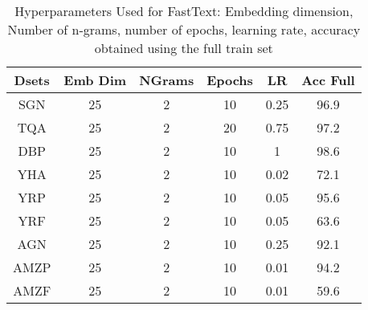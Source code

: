 \documentclass[11pt,a4paper]{article}
\begin{document}
\begin{table}[t]
\begin{center}
\small\addtolength{\tabcolsep}{-3pt}
\begin{tabular}{|c|c|c|c|c|c|}
\hline
Dsets & Emb Dim & NGrams & Epochs & LR & Acc Full  \\ \hline
SGN &  25 & 2 & 10 & 0.25 & 96.9   \\ \hline
TQA &  25 & 2 & 20 & 0.75 & 97.2 \\ \hline
DBP  &  25 & 2 & 10 & 1 & 98.6 \\ \hline
YHA  &  25 & 2 & 10 & 0.02 & 72.1   \\ \hline
YRP  &  25 & 2 & 10 & 0.05 & 95.6 \\ \hline
YRF & 25 & 2 & 10 & 0.05 & 63.6 \\ \hline
AGN & 25 & 2 & 10 & 0.25 & 92.1 \\ \hline
AMZP &   25 & 2 & 10 & 0.01 & 94.2  \\ \hline
AMZF  & 25 & 2 & 10 & 0.01 & 59.6  \\ \hline
\end{tabular}
\caption{Hyperparameters Used for FastText: Embedding dimension, Number of n-grams, number of epochs, learning rate, accuracy obtained using the full train set}
\label{tab:fast_hyper}
\end{center}
\end{table}
\end{document}
